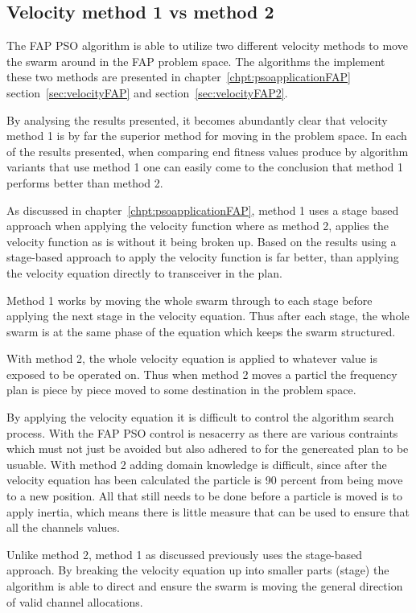 \subsection{Velocity method 1 vs method 2}
The FAP PSO algorithm is able to utilize two different velocity methods to move the swarm around in the FAP problem space. The algorithms the implement these two methods are presented in chapter~\ref{chpt:psoapplicationFAP} section~\ref{sec:velocityFAP} and section~\ref{sec:velocityFAP2}.

By analysing the results presented, it becomes abundantly clear that velocity method 1 is by far the superior method for moving in the problem space. In each of the results presented, when comparing end fitness values produce by algorithm variants that use method 1 one can easily come to the conclusion that method 1 performs better than method 2.

As discussed in chapter~\ref{chpt:psoapplicationFAP}, method 1 uses a stage based approach when applying the velocity function where as method 2, applies the velocity function as is without it being broken up. Based on the results using a stage-based approach to apply the velocity function is far better, than applying the velocity equation directly to transceiver in the plan.

Method 1 works by moving the whole swarm through to each stage before applying the next stage in the velocity equation. Thus after each stage, the whole swarm is at the same phase of the equation which keeps the swarm structured.

With method 2, the whole velocity equation is applied to whatever value is exposed to be operated on. Thus when method 2 moves a particl the frequency plan is piece by piece moved to some destination in the problem space.

By applying the velocity equation it is difficult to control the algorithm search process. With the FAP PSO control is nesacerry as there are various contraints which must not just be avoided but also adhered to for the genereated plan to be usuable. With method 2 adding domain knowledge is difficult, since after the velocity equation has been calculated the particle is 90 percent from being move to a new position. All that still needs to be done before a particle is moved is to apply inertia, which means there is little measure that can be used to ensure that all the channels values.

Unlike method 2, method 1 as discussed previously uses the stage-based approach. By breaking the velocity equation up into smaller parts (stage) the algorithm is able to direct and ensure the swarm is moving the general direction of valid channel allocations.


